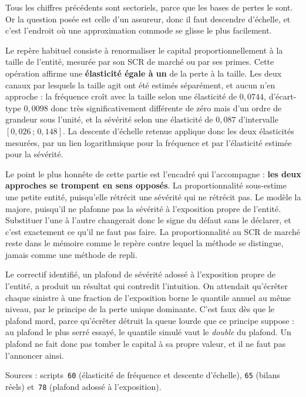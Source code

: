 \documentclass[12pt,a4paper]{article}
\theoremstyle{definition}
\begin{document}
Tous les chiffres précédents sont sectoriels, parce que les bases de pertes le
sont. Or la question posée est celle d'un assureur, donc il faut descendre
d'échelle, et c'est l'endroit où une approximation commode se glisse le plus
facilement.

Le repère habituel consiste à renormaliser le capital proportionnellement à la
taille de l'entité, mesurée par son SCR de marché ou par ses primes. Cette
opération affirme une \textbf{élasticité égale à un} de la perte à la taille. Les
deux canaux par lesquels la taille agit ont été estimés séparément, et aucun n'en
approche : la fréquence croît avec la taille selon une élasticité de $0{,}0744$,
d'écart-type $0{,}0098$ donc très significativement différente de zéro mais d'un
ordre de grandeur sous l'unité, et la sévérité selon une élasticité de $0{,}087$
d'intervalle $[0{,}026\,;\,0{,}148]$. La descente d'échelle retenue applique donc
les deux élasticités mesurées, par un lien logarithmique pour la fréquence et par
l'élasticité estimée pour la sévérité.

Le point le plus honnête de cette partie est l'encadré qui l'accompagne :
\textbf{les deux approches se trompent en sens opposés}. La proportionnalité
sous-estime une petite entité, puisqu'elle rétrécit une sévérité qui ne rétrécit
pas. Le modèle la majore, puisqu'il ne plafonne pas la sévérité à l'exposition
propre de l'entité. Substituer l'une à l'autre changerait donc le signe du défaut
sans le déclarer, et c'est exactement ce qu'il ne faut pas faire. La
proportionnalité au SCR de marché reste dans le mémoire comme le repère contre
lequel la méthode se distingue, jamais comme une méthode de repli.

Le correctif identifié, un plafond de sévérité adossé à l'exposition propre de
l'entité, a produit un résultat qui contredit l'intuition. On attendait qu'écrêter
chaque sinistre à une fraction de l'exposition borne le quantile annuel au même
niveau, par le principe de la perte unique dominante. C'est faux dès que le
plafond mord, parce qu'écrêter détruit la queue lourde que ce principe suppose :
au plafond le plus serré essayé, le quantile simulé vaut le \emph{double} du
plafond. Un plafond ne fait donc pas tomber le capital à sa propre valeur, et il ne
faut pas l'annoncer ainsi.

\vspace{4pt}
\noindent Sources : scripts~\texttt{60} (élasticité de fréquence et descente
d'échelle), \texttt{65} (bilans réels) et~\texttt{78} (plafond adossé à
l'exposition).
\end{document}
